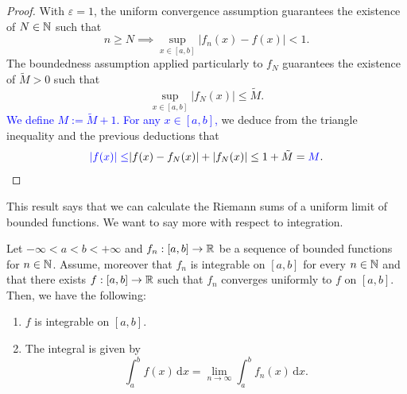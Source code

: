\begin{proof}
	With $\varepsilon=1$, the uniform convergence assumption guarantees the existence of $N\in\mathbb{N}$ such that
	\[
	n\ge N \implies \sup_{x\in[a,b]}|f_n(x) - f(x)|<1.
	\]
	The boundedness assumption applied particularly to $f_N$ guarantees the existence of $\tilde{M}>0$ such that
	\[
	\sup_{x\in[a,b]}|f_N(x)|\le \tilde{M}.
	\]
	\textcolor{blue}{We define $M:= \tilde{M}+1$. For any $x\in[a,b]$,} we deduce from the triangle inequality and the previous deductions that
	\[
	\textcolor{blue}{|f(x)| \le} |f(x) - f_N(x)| + |f_N(x)| \le 1 + \tilde{M} = \textcolor{blue}{M}.
	\]
\end{proof}
This result says that we can calculate the Riemann sums of a uniform limit of bounded functions. We want to say more with respect to integration.
\begin{thm}
	\label{thm:unif_int}
	Let $-\infty<a<b<+\infty$ and $f_n:[a,b]\to\mathbb{R}$ be a sequence of bounded functions for $n\in\mathbb{N}$. Assume, moreover that $f_n$ is integrable on $[a,b]$ for every $n\in\mathbb{N}$ and that there exists $f:[a,b]\to\mathbb{R}$ such that $f_n$ converges uniformly to $f$ on $[a,b]$. Then, we have the following:
	\begin{enumerate}
		\item $f$ is integrable on $[a,b]$.
		\item The integral is given by
		\[
		\int_a^bf(x)\,\mathrm{d}x = \lim_{n\to\infty}\int_a^b f_n(x)\,\mathrm{d}x.
		\]
	\end{enumerate}
\end{thm}
